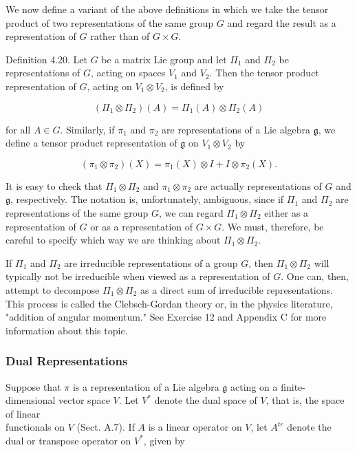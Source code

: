 \documentclass[10pt, letterpaper]{article}
\begin{document}
We now define a variant of the above definitions in which we take the tensor product of two representations of the same group $G$ and regard the result as a representation of $G$ rather than of $G \times G$.

Definition 4.20. Let $G$ be a matrix Lie group and let $\Pi_{1}$ and $\Pi_{2}$ be representations of $G$, acting on spaces $V_{1}$ and $V_{2}$. Then the tensor product representation of $G$, acting on $V_{1} \otimes V_{2}$, is defined by

$$
\left(\Pi_{1} \otimes \Pi_{2}\right)(A)=\Pi_{1}(A) \otimes \Pi_{2}(A)
$$

for all $A \in G$. Similarly, if $\pi_{1}$ and $\pi_{2}$ are representations of a Lie algebra $\mathfrak{g}$, we define a tensor product representation of $\mathfrak{g}$ on $V_{1} \otimes V_{2}$ by

$$
\left(\pi_{1} \otimes \pi_{2}\right)(X)=\pi_{1}(X) \otimes I+I \otimes \pi_{2}(X) .
$$

It is easy to check that $\Pi_{1} \otimes \Pi_{2}$ and $\pi_{1} \otimes \pi_{2}$ are actually representations of $G$ and $\mathfrak{g}$, respectively. The notation is, unfortunately, ambiguous, since if $\Pi_{1}$ and $\Pi_{2}$ are representations of the same group $G$, we can regard $\Pi_{1} \otimes \Pi_{2}$ either as a representation of $G$ or as a representation of $G \times G$. We must, therefore, be careful to specify which way we are thinking about $\Pi_{1} \otimes \Pi_{2}$.

If $\Pi_{1}$ and $\Pi_{2}$ are irreducible representations of a group $G$, then $\Pi_{1} \otimes \Pi_{2}$ will typically not be irreducible when viewed as a representation of $G$. One can, then, attempt to decompose $\Pi_{1} \otimes \Pi_{2}$ as a direct sum of irreducible representations. This process is called the Clebsch-Gordan theory or, in the physics literature, "addition of angular momentum." See Exercise 12 and Appendix C for more information about this topic.

\subsubsection*{Dual Representations}
Suppose that $\pi$ is a representation of a Lie algebra $\mathfrak{g}$ acting on a finite-dimensional vector space $V$. Let $V^{*}$ denote the dual space of $V$, that is, the space of linear\\
functionals on $V$ (Sect. A.7). If $A$ is a linear operator on $V$, let $A^{t r}$ denote the dual or transpose operator on $V^{*}$, given by
\end{document}
